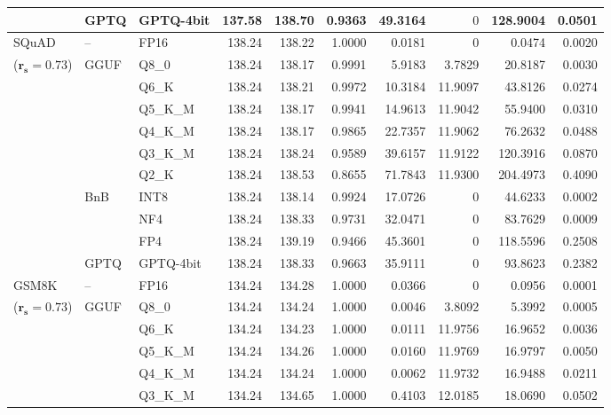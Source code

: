 \begin{longtable}{ll l rrrrrrr}
 & GPTQ & GPTQ-4bit & 137.58 & 138.70 & \cellcolor{red!18} 0.9363 & \cellcolor{red!18} 49.3164 & \cellcolor{cyan!12} $0$ & \cellcolor{red!18} 128.9004 & \cellcolor{red!18} 0.0501 \\
\midrule
SQuAD & -- & FP16 & 138.24 & 138.22 & 1.0000 & 0.0181 & \cellcolor{cyan!12} $0$ & 0.0474 & 0.0020 \\
{\small ($\mathbf{r_s{=}0.73}$)} & GGUF & Q8\_0 & 138.24 & 138.17 & 0.9991 & 5.9183 & 3.7829 & 20.8187 & 0.0030 \\
 &  & Q6\_K & 138.24 & 138.21 & 0.9972 & 10.3184 & 11.9097 & 43.8126 & 0.0274 \\
 &  & Q5\_K\_M & 138.24 & 138.17 & 0.9941 & 14.9613 & 11.9042 & 55.9400 & 0.0310 \\
 &  & Q4\_K\_M & 138.24 & 138.17 & 0.9865 & 22.7357 & 11.9062 & 76.2632 & 0.0488 \\
 &  & Q3\_K\_M & 138.24 & 138.24 & 0.9589 & 39.6157 & 11.9122 & 120.3916 & 0.0870 \\
 &  & Q2\_K & 138.24 & 138.53 & \cellcolor{red!18} 0.8655 & \cellcolor{red!18} 71.7843 & 11.9300 & \cellcolor{red!18} 204.4973 & \cellcolor{red!18} 0.4090 \\
 & BnB & INT8 & 138.24 & 138.14 & 0.9924 & 17.0726 & \cellcolor{cyan!12} $0$ & 44.6233 & 0.0002 \\
 &  & NF4 & 138.24 & 138.33 & 0.9731 & 32.0471 & \cellcolor{cyan!12} $0$ & 83.7629 & 0.0009 \\
 &  & FP4 & 138.24 & 139.19 & \cellcolor{red!18} 0.9466 & \cellcolor{red!18} 45.3601 & \cellcolor{cyan!12} $0$ & \cellcolor{red!18} 118.5596 & \cellcolor{red!18} 0.2508 \\
 & GPTQ & GPTQ-4bit & 138.24 & 138.33 & 0.9663 & 35.9111 & \cellcolor{cyan!12} $0$ & 93.8623 & 0.2382 \\
\midrule
GSM8K & -- & FP16 & 134.24 & 134.28 & 1.0000 & 0.0366 & \cellcolor{cyan!12} $0$ & 0.0956 & 0.0001 \\
{\small ($\mathbf{r_s{=}0.73}$)} & GGUF & Q8\_0 & 134.24 & 134.24 & 1.0000 & 0.0046 & 3.8092 & 5.3992 & 0.0005 \\
 &  & Q6\_K & 134.24 & 134.23 & 1.0000 & 0.0111 & 11.9756 & 16.9652 & 0.0036 \\
 &  & Q5\_K\_M & 134.24 & 134.26 & 1.0000 & 0.0160 & 11.9769 & 16.9797 & 0.0050 \\
 &  & Q4\_K\_M & 134.24 & 134.24 & 1.0000 & 0.0062 & 11.9732 & 16.9488 & 0.0211 \\
 &  & Q3\_K\_M & 134.24 & 134.65 & 1.0000 & 0.4103 & 12.0185 & 18.0690 & 0.0502 \\

\end{longtable}
